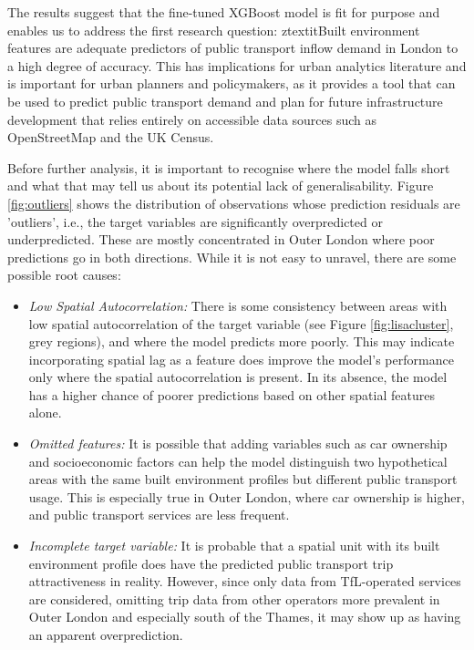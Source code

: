 The results suggest that the fine-tuned XGBoost model is fit for purpose and enables us to address the first research question: ztextit{Built environment features are adequate predictors of public transport inflow demand in London to a high degree of accuracy}. This has implications for urban analytics literature and is important for urban planners and policymakers, as it provides a tool that can be used to predict public transport demand and plan for future infrastructure development that relies entirely on accessible data sources such as OpenStreetMap and the UK Census.

Before further analysis, it is important to recognise where the model falls short and what that may tell us about its potential lack of generalisability. Figure \ref{fig:outliers} shows the distribution of observations whose prediction residuals are 'outliers', i.e., the target variables are significantly overpredicted or underpredicted. These are mostly concentrated in Outer London where poor predictions go in both directions. While it is not easy to unravel, there are some possible root causes: 

\begin{itemize}
    \setlength\itemsep{0em}
    \item \textit{Low Spatial Autocorrelation:} There is some consistency between areas with low spatial autocorrelation of the target variable (see Figure \ref{fig:lisacluster}, grey regions), and where the model predicts more poorly. This may indicate incorporating spatial lag as a feature does improve the model's performance only where the spatial autocorrelation is present. In its absence, the model has a higher chance of poorer predictions based on other spatial features alone.
    \item \textit{Omitted features:} It is possible that adding variables such as car ownership and socioeconomic factors can help the model distinguish two hypothetical areas with the same built environment profiles but different public transport usage. This is especially true in Outer London, where car ownership is higher, and public transport services are less frequent.
    \item \textit{Incomplete target variable:} It is probable that a spatial unit with its built environment profile does have the predicted public transport trip attractiveness in reality. However, since only data from TfL-operated services are considered, omitting trip data from other operators more prevalent in Outer London and especially south of the Thames, it may show up as having an apparent overprediction. 
\end{itemize}

